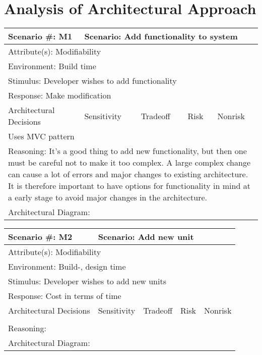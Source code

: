 \section{Analysis of Architectural Approach}

\begin{tabular}{|m{}|m{}|m{}|m{}|m{}|m{}|}
  \hline
  Scenario \#: M1 & \multicolumn{5}{m{0.75 \textwidth}|}{Scenario: Add functionality to system} \\ \hline
  \multicolumn{6}{|m{0.9 \textwidth}|}{Attribute(s): Modifiability} \\ \hline
  \multicolumn{6}{|m{0.9 \textwidth}|}{Environment: Build time} \\ \hline
  \multicolumn{6}{|m{0.9 \textwidth}|}{Stimulus: Developer wishes to add functionality} \\ \hline
  \multicolumn{6}{|m{0.9 \textwidth}|}{Response: Make modification} \\ \hline
  \multicolumn{2}{|m{0.3 \textwidth}|}{Architectural Decisions} & Sensitivity & Tradeoff & Risk & Nonrisk \\ \hline
  \multicolumn{2}{|m{0.3 \textwidth}|}{Uses MVC pattern} &  &  &  &  \\ \hline
  \multicolumn{6}{|m{0.9 \textwidth}|}{Reasoning: It's a good thing to add new functionality, but then one must be careful not to make it too complex. A large complex change can cause a lot of errors and major changes to existing architecture. It is therefore important to have options for functionality in mind at a early stage to avoid major changes in the architecture.} \\ \hline
  \multicolumn{6}{|m{0.9 \textwidth}|}{Architectural Diagram: } \\ \hline
\end{tabular}

\begin{tabular}{|m{}|m{}|m{}|m{}|m{}|m{}|}
  \hline
  Scenario \#: M2 & \multicolumn{5}{m{0.75 \textwidth}|}{Scenario: Add new unit} \\ \hline
  \multicolumn{6}{|m{0.9 \textwidth}|}{Attribute(s): Modifiability} \\ \hline
  \multicolumn{6}{|m{0.9 \textwidth}|}{Environment: Build-, design time} \\ \hline
  \multicolumn{6}{|m{0.9 \textwidth}|}{Stimulus: Developer wishes to add new units} \\ \hline
  \multicolumn{6}{|m{0.9 \textwidth}|}{Response: Cost in terms of time} \\ \hline
  \multicolumn{2}{|m{0.3 \textwidth}|}{Architectural Decisions} & Sensitivity & Tradeoff & Risk & Nonrisk \\ \hline
  \multicolumn{2}{|m{0.3 \textwidth}|}{} &  &  &  &  \\ \hline
  \multicolumn{6}{|m{0.9 \textwidth}|}{Reasoning:} \\ \hline
  \multicolumn{6}{|m{0.9 \textwidth}|}{Architectural Diagram: } \\ \hline
\end{tabular}

